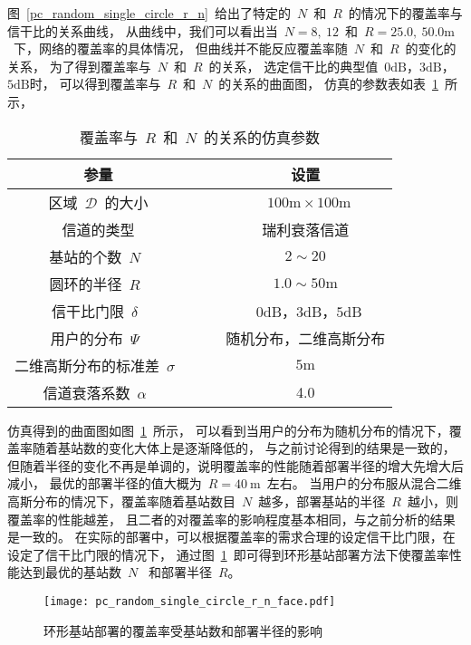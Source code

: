图~\ref{pc_random_single_circle_r_n}~给出了特定的~$N$~和~$R$~的情况下的覆盖率与信干比的关系曲线，
从曲线中，我们可以看出当~$N=8, ~12$~和~$R=25.0,~50.0\mathrm{m}$~下，网络的覆盖率的具体情况，
但曲线并不能反应覆盖率随~$N$~和~$R$~的变化的关系，
为了得到覆盖率与~$N$~和~$R$~的关系，
选定信干比的典型值~$0\mathrm{dB}$，$3\mathrm{dB}$，$5\mathrm{dB}$时，
可以得到覆盖率与~$R$~和~$N$~的关系的曲面图，
仿真的参数表如表~\ref{pc_random_single_circle_r_n_table}~所示，
\begin{table}[htbp]
\caption{覆盖率与~$R$~和~$N$~的关系的仿真参数}
\label{pc_random_single_circle_r_n_table}
\vspace{0.5em}\centering\wuhao
\begin{tabular}{cccc}
\toprule[1.5pt]
参量 & & & 设置 \\
\midrule[0.5pt]
区域~$\mathcal{D}$~的大小  & & & ~$100\mathrm{m} \times 100 \mathrm{m}$ \\
信道的类型 & & &  瑞利衰落信道\\
基站的个数~$N$~ & & &  $2\sim20$\\
圆环的半径~$R$~ & & &  $1.0\sim 50\mathrm{m}$\\
信干比门限~$\delta$~  & & & ~$0\mathrm{dB}$，$3\mathrm{dB}$，$5\mathrm{dB}$\\
用户的分布~$\Psi$~ & & & 随机分布，二维高斯分布\\
二维高斯分布的标准差~$\sigma$~ & & & ${5\mathrm{m}}$\\
信道衰落系数~$\alpha$~  & & & 4.0\\
\bottomrule[1.5pt]
\end{tabular}
\end{table}
仿真得到的曲面图如图~\ref{pc_random_single_circle_r_n_face}~所示，
可以看到当用户的分布为随机分布的情况下，覆盖率随着基站数的变化大体上是逐渐降低的，
与之前讨论得到的结果是一致的，但随着半径的变化不再是单调的，说明覆盖率的性能随着部署半径的增大先增大后减小，
最优的部署半径的值大概为~$R = 40~\mathrm{m}$~左右。
当用户的分布服从混合二维高斯分布的情况下，覆盖率随着基站数目~$N$~越多，部署基站的半径~$R$~越小，则覆盖率的性能越差，
且二者的对覆盖率的影响程度基本相同，与之前分析的结果是一致的。
在实际的部署中，可以根据覆盖率的需求合理的设定信干比门限，在设定了信干比门限的情况下，
通过图~\ref{pc_random_single_circle_r_n_face}~即可得到环形基站部署方法下使覆盖率性能达到最优的基站数~$N$~
和部署半径~$R$。
\begin{figure}[htbp]
\centering
\texttt{[image: pc\_random\_single\_circle\_r\_n\_face.pdf]}
\caption{环形基站部署的覆盖率受基站数和部署半径的影响}\vspace{-0.5em}
\label{pc_random_single_circle_r_n_face}
\end{figure}


